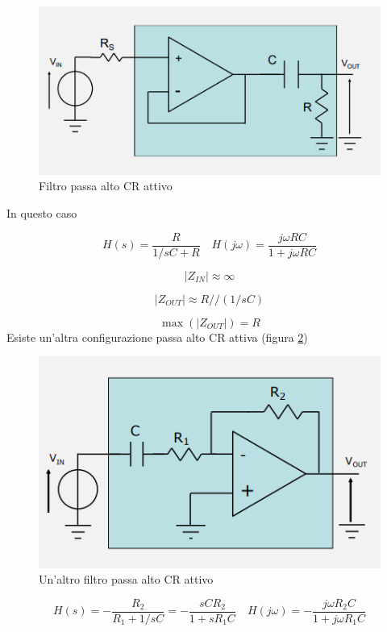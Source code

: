 \documentclass{article}
\begin{document}
\begin{figure}[h]
  \centering
  \includegraphics[scale=0.7]{IM_filtro_passa_alto_CR_attivo}
  \caption{Filtro passa alto CR attivo}
  \label{Schema_filtro_passa_alto_CR_attivo}
\end{figure}

In questo caso 

\[H(s) = \frac{R}{1/sC + R} \quad H(j \omega) = \frac{j \omega RC}{1 + j \omega RC}\]

\[|Z_{IN}| \approx \infty\]

\[|Z_{OUT}| \approx R // (1/sC)\]

\[\max(|Z_{OUT}|) = R\]
\clearpage
Esiste un'altra configurazione passa alto CR attiva (figura \ref{Schema_filtro_passa_alto_CR_attivo_bis})

\begin{figure}[h]
  \centering
  \includegraphics[scale=0.5]{IM_filtro_passa_alto_CR_attivo_bis}
  \caption{Un'altro filtro passa alto CR attivo}
  \label{Schema_filtro_passa_alto_CR_attivo_bis}
\end{figure}

\[H(s) = - \frac{R_2}{R_1 + 1/sC} = -  \frac{sCR_2}{1 + sR_1 C} \quad H(j \omega) = - \frac{j \omega R_2 C}{1 + j \omega R_1 C}\]
\end{document}
